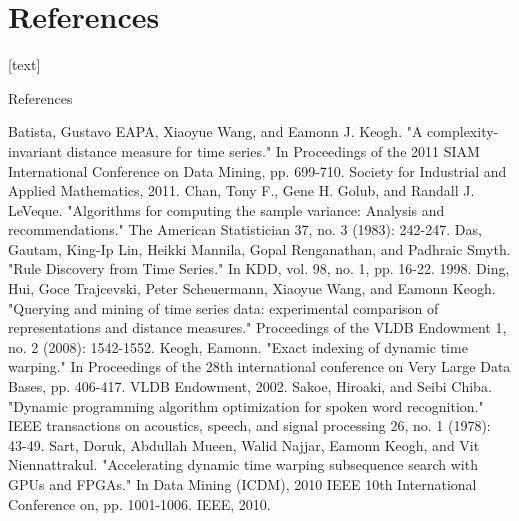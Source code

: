 \section{References}

[text]

\begin{frame}[allowframebreaks]{References}
    \begin{thebibliography}{1}
         Batista, Gustavo EAPA, Xiaoyue Wang, and Eamonn J. Keogh. "A complexity-invariant
            distance measure for time series." In Proceedings of the 2011 SIAM International Conference on Data Mining, pp.
            699-710. Society for Industrial and Applied Mathematics, 2011.
         Chan, Tony F., Gene H. Golub, and Randall J. LeVeque. "Algorithms for computing the
            sample variance: Analysis and recommendations." The American Statistician 37, no. 3 (1983): 242-247.
         Das, Gautam, King-Ip Lin, Heikki Mannila, Gopal Renganathan, and Padhraic Smyth. "Rule
            Discovery from Time Series." In KDD, vol. 98, no. 1, pp. 16-22. 1998.
         Ding, Hui, Goce Trajcevski, Peter Scheuermann, Xiaoyue Wang, and Eamonn Keogh. "Querying
            and mining of time series data: experimental comparison of representations and distance measures." Proceedings
            of the VLDB Endowment 1, no. 2 (2008): 1542-1552.
         Keogh, Eamonn. "Exact indexing of dynamic time warping." In Proceedings of the 28th
            international conference on Very Large Data Bases, pp. 406-417. VLDB Endowment, 2002.
         Sakoe, Hiroaki, and Seibi Chiba. "Dynamic programming algorithm optimization for spoken
            word recognition." IEEE transactions on acoustics, speech, and signal processing 26, no. 1 (1978): 43-49.
         Sart, Doruk, Abdullah Mueen, Walid Najjar, Eamonn Keogh, and Vit Niennattrakul.
            "Accelerating dynamic time warping subsequence search with GPUs and FPGAs." In Data Mining (ICDM), 2010 IEEE
            10th International Conference on, pp. 1001-1006. IEEE, 2010.
    \end{thebibliography}
\end{frame}
